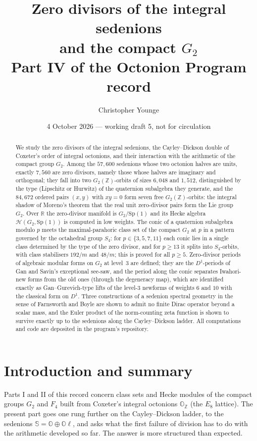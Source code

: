 \documentclass[11pt]{amsart}
\title[Zero divisors of the integral sedenions]{Zero divisors of the integral sedenions\\ and the compact $G_2$\\[4pt] {\normalsize Part IV of the Octonion Program record}}
\author{Christopher Younge}
\date{4 October 2026 --- working draft 5, not for circulation}
\theoremstyle{definition}
\renewcommand{\O}{\mathbb{O}}\newcommand{\Sd}{\mathbb{S}}\newcommand{\Hq}{\mathbb{H}}\newcommand{\Z}{\mathbb{Z}}\newcommand{\Q}{\mathbb{Q}}\newcommand{\R}{\mathbb{R}}\newcommand{\C}{\mathbb{C}}\newcommand{\F}{\mathbb{F}}
\begin{document}
\begin{abstract}
We study the zero divisors of the integral sedenions, the Cayley--Dickson double of Coxeter's order of integral octonions, and their interaction with the arithmetic of the compact group $G_2$. Among the $57{,}600$ sedenions whose two octonion halves are units, exactly $7{,}560$ are zero divisors, namely those whose halves are imaginary and orthogonal; they fall into two $G_2(\Z)$-orbits of sizes $6{,}048$ and $1{,}512$, distinguished by the type (Lipschitz or Hurwitz) of the quaternion subalgebra they generate, and the $84{,}672$ ordered pairs $(x,y)$ with $xy=0$ form seven free $G_2(\Z)$-orbits: the integral shadow of Moreno's theorem that the real unit zero-divisor pairs form the Lie group $G_2$. Over $\R$ the zero-divisor manifold is $G_2/\mathrm{Sp}(1)$ and its Hecke algebra $\mathcal H(G_2,\mathrm{Sp}(1))$ is computed in low weights. The conic of a quaternion subalgebra modulo $p$ meets the maximal-parahoric class set of the compact $G_2$ at $p$ in a pattern governed by the octahedral group $S_4$: for $p\in\{3,5,7,11\}$ each conic lies in a single class determined by the type of the zero divisor, and for $p\ge 13$ it splits into $S_4$-orbits, with class stabilisers $192/m$ and $48/m$; this is proved for all $p\ge 5$. Zero-divisor periods of algebraic modular forms on $G_2$ at level~3 are defined; they are the $D^1$-periods of Gan and Savin's exceptional see-saw, and the period along the conic separates Iwahori-new forms from the old ones (through the degeneracy map), which are identified exactly as Gan--Gurevich-type lifts of the level-$3$ newforms of weights $6$ and $10$ with the classical form on $D^1$. Three constructions of a sedenion spectral geometry in the sense of Farnsworth and Boyle are shown to admit no finite Dirac operator beyond a scalar mass, and the Euler product of the norm-counting zeta function is shown to survive exactly up to the sedenions along the Cayley--Dickson ladder. All computations and code are deposited in the program's repository.
\end{abstract}
\maketitle
\tableofcontents

\section{Introduction and summary}
Parts I and II of this record \cite{PartI,PartII} concern class sets and Hecke modules of the compact groups $G_2$ and $F_4$ built from Coxeter's integral octonions $\O_\Z$ (the $E_8$ lattice). The present part goes one rung further on the Cayley--Dickson ladder, to the sedenions $\Sd=\O\oplus\O\ell$, and asks what the first failure of division has to do with the arithmetic developed so far. The answer is more structured than expected.
\end{document}

